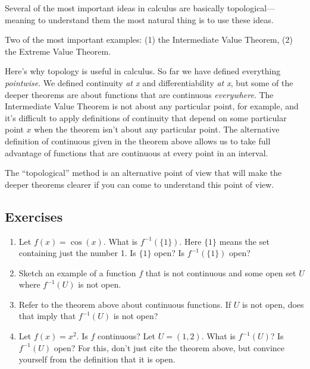 \documentclass[11pt]{book}
\numberwithin{example}{chapter}
\begin{document}
Several of the most important ideas in calculus are basically topological---meaning to understand them the most natural thing is to use these ideas.  

Two of the most important examples: (1) the Intermediate Value Theorem, (2) the Extreme Value Theorem.


Here's why topology is useful in calculus.  So far we have defined everything \emph{pointwise}.  We defined continuity \emph{at x} and differentiability \emph{at x}, but some of the deeper theorems are about functions that are continuous \emph{everywhere}.  The Intermediate Value Theorem is not about any particular point, for example, and it's difficult to apply definitions of continuity that depend on some particular point $x$ when the theorem isn't about any particular point.  The alternative definition of continuous given in the theorem above allows us to take full advantage of functions that are continuous at every point in an interval.  

The ``topological'' method is an alternative point of view that will make the deeper theorems clearer if you can come to understand this point of view.  



\subsection{Exercises}

\begin{enumerate}
\item
Let $f(x)=\cos(x)$.  What is $f^{-1}(\{1\})$.  Here $\{1\}$ means the set containing just the number 1. Is $\{1\}$ open?  Is $f^{-1}(\{1\})$ open?




\item
Sketch an example of a function $f$ that is not continuous and some open set $U$ where $f^{-1}(U)$ is not open.  

\item
Refer to the theorem above about continuous functions.  If $U$ is not open, does that imply that $f^{-1}(U)$ is not open?

\item
Let $f(x)=x^2$.  Is $f$ continuous?  Let $U=(1,2)$. What is $f^{-1}(U)$?  Is $f^{-1}(U)$ open?  For this, don't just cite the theorem above, but convince yourself from the definition that it is open.



\end{enumerate}
\end{document}
